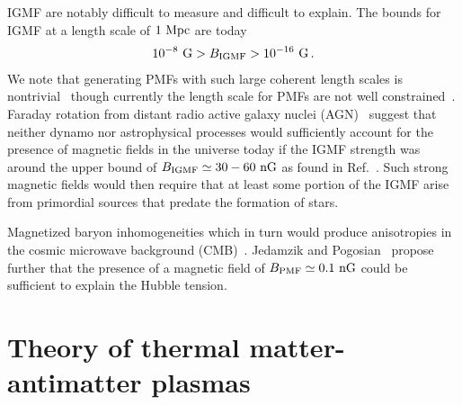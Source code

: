IGMF are notably difficult to measure and difficult to explain. The bounds for IGMF at a length scale of $1{\rm\ Mpc}$ are today~\citep{Neronov:2010gir,Taylor:2011bn,Pshirkov:2015tua,Jedamzik:2018itu,Vernstrom:2021hru}
\begin{gather}
 \label{igmf}
 10^{-8}{\rm\ G}>B_{\rm IGMF}>10^{-16}{\rm\ G}\,.
\end{gather}
We note that generating PMFs with such large coherent length scales is nontrivial~\citep{Giovannini:2022rrl} though currently the length scale for PMFs are not well constrained~\citep{AlvesBatista:2021sln}. Faraday rotation from distant radio active galaxy nuclei (AGN)~\citep{Pomakov:2022cem} suggest that neither dynamo nor astrophysical processes would sufficiently account for the presence of magnetic fields in the universe today if the IGMF strength was around the upper bound of $B_{\rm IGMF}\simeq30-60{\rm\ nG}$ as found in Ref.~\citep{Vernstrom:2021hru}. Such strong magnetic fields would then require that at least some portion of the IGMF arise from primordial sources that predate the formation of stars.

Magnetized baryon inhomogeneities which in turn would produce anisotropies in the cosmic microwave background (CMB)~\cite{Jedamzik:2013gua,Abdalla:2022yfr}. Jedamzik and Pogosian~\cite{Jedamzik:2020krr} propose further that the presence of a magnetic field of $B_{\rm PMF}\simeq0.1{\rm\ nG}$ could be sufficient to explain the Hubble tension.

\section{Theory of thermal matter-antimatter plasmas}
\label{sec:theory}

